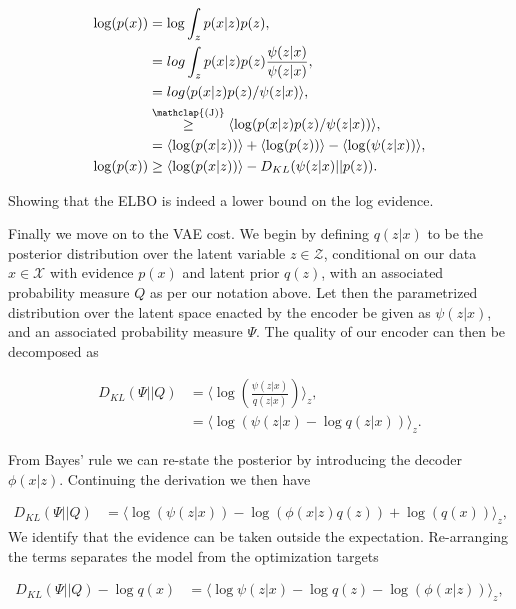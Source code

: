 \begin{align}
\log (p(x)) &= \log \int_z p(x|z) p(z), \\
&= log \int _z p(x|z) p(z) \frac{\psi(z|x)}{\psi(z|x)},\\
& = log \langle p(x|z) p(z)/ \psi (z|x) \rangle, \\
&  \stackrel{\mathclap{\text{(J)}}}{\geq} \langle \log (p(x|z) p(z)/ \psi(z|x))\rangle,\\
& = \langle \log(p(x|z))\rangle + \langle \log(p(z))\rangle  - \langle \log(\psi (z|x))\rangle, \\
\log (p (x)) &\geq \langle \log(p(x|z))\rangle - D_{KL}(\psi (z|x) || p(z)).
\end{align}

\noindent Showing that the ELBO is indeed a lower bound on the log evidence. 

Finally we move on to the VAE cost. We begin by defining $q(z|x)$ to be the posterior distribution over the latent variable $z \in \mathcal{Z}$, conditional on our data $x \in \mathcal{X}$ with evidence $p(x)$ and latent prior $q(z)$, with an associated probability measure $Q$ as per our notation above. Let then the parametrized distribution over the latent space enacted by the encoder be given as $\psi(z|x)$, and an associated probability measure $\Psi$. The quality of our encoder can then be decomposed as 

\begin{align}
D_{KL}(\Psi || Q ) &= \langle \log \left(\frac{\psi(z|x)}{q(z|x)}\right) \rangle_z, \\
&= \langle \log \left(\psi(z|x)- \log q(z|x)\right) \rangle_z.
\end{align}

\noindent From Bayes' rule we can re-state the posterior by introducing the decoder $\phi(x|z)$. Continuing the derivation we then have 

\begin{align}
D_{KL}(\Psi || Q ) &=  \langle \log \left( \psi(z|x)\right)  - \log \left( \phi( x | z) q(z) \right) + \log (q(x))\rangle_z, 
\end{align}
\noindent We identify that the evidence can be taken outside the expectation. Re-arranging the terms separates the model from the optimization targets 

\begin{align}
D_{KL}(\Psi || Q ) - \log q(x) &=  \langle \log \psi(z|x) - \log q(z) - \log \left( \phi( x | z)\right) \rangle_z, 
\end{align}

